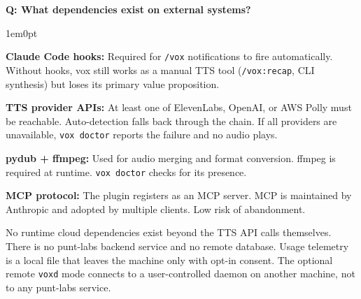 \documentclass[11pt,letterpaper]{article}
\newcounter{faqnum}
\newenvironment{faqpair}[1]{%
  \needspace{4\baselineskip}%
  \vspace{0.5em}%
  \refstepcounter{faqnum}%
  \noindent\textbf{\color{SectionBlue}Q\thefaqnum: #1}\par\nopagebreak[4]%
  \vspace{0.2em}%
  \begin{adjustwidth}{1em}{0pt}%
  \setlength{\parindent}{0pt}%
}{%
  \end{adjustwidth}%
  \vspace{0.5em}%
}
\begin{document}
\begin{faqpair}{What dependencies exist on external systems?}
  \textbf{Claude Code hooks:} Required for \texttt{/vox} notifications to fire
  automatically. Without hooks, vox still works as a manual TTS tool
  (\texttt{/vox:recap}, CLI synthesis) but loses its primary value proposition.

  \textbf{TTS provider APIs:} At least one of ElevenLabs, OpenAI, or AWS
  Polly must be reachable. Auto-detection falls back through the chain.
  If all providers are unavailable, \texttt{vox doctor} reports the failure
  and no audio plays.

  \textbf{pydub + ffmpeg:} Used for audio merging and format conversion.
  ffmpeg is required at runtime. \texttt{vox doctor} checks for its presence.

  \textbf{MCP protocol:} The plugin registers as an MCP server. MCP is
  maintained by Anthropic and adopted by multiple clients. Low risk of
  abandonment.

  No runtime cloud dependencies exist beyond the TTS API calls themselves.
  There is no punt-labs backend service and no remote database. Usage
  telemetry is a local file that leaves the machine only with opt-in
  consent. The optional
  remote \texttt{voxd} mode connects to a user-controlled daemon on another
  machine, not to any punt-labs service.
\end{faqpair}
\end{document}
